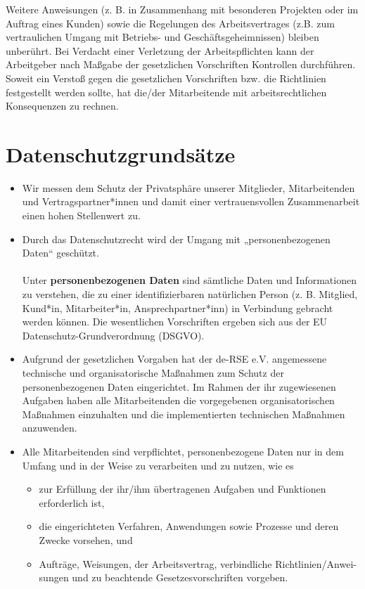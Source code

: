 \documentclass[a4paper, fontsize=11pt]{scrartcl}
\begin{document}
Weitere Anweisungen (z. B. in Zusammenhang mit besonderen Projekten oder im Auftrag eines Kunden) sowie die Regelungen des Arbeitsvertrages (z.B. zum vertraulichen Umgang mit Betriebs- und Geschäftsgeheimnissen) bleiben unberührt. Bei Verdacht einer Verletzung der Arbeitspflichten kann der Arbeitgeber nach Maßgabe der gesetzlichen Vorschriften Kontrollen durchführen. Soweit ein Verstoß gegen die gesetzlichen Vorschriften bzw. die Richtlinien festgestellt werden sollte, hat die/der Mitarbeitende mit arbeitsrechtlichen Konsequenzen zu rechnen.

\section{Datenschutzgrundsätze}
\begin{itemize}
  \item Wir messen dem Schutz der Privatsphäre unserer Mitglieder, Mitarbeitenden und Vertragspartner*innen und damit einer vertrauensvollen Zusammenarbeit einen hohen Stellenwert zu.
  \item Durch das Datenschutzrecht wird der Umgang mit „personenbezogenen Daten“ geschützt.\\
  \\
  Unter \textbf{personenbezogenen Daten} sind sämtliche Daten und Informationen zu verstehen, die zu einer identifizierbaren natürlichen Person (z. B. Mitglied, Kund*in, Mitarbeiter*in, Ansprechpartner*inn) in Verbindung gebracht werden können. Die wesentlichen Vorschriften ergeben sich aus der EU Datenschutz-Grundverordnung (DSGVO).
  \item Aufgrund der gesetzlichen Vorgaben hat der de-RSE e.V. angemessene technische und organisatorische Maßnahmen zum Schutz der personenbezogenen Daten eingerichtet. Im Rahmen der ihr zugewiesenen Aufgaben haben alle Mitarbeitenden die vorgegebenen organisatorischen Maßnahmen einzuhalten und die implementierten technischen Maßnahmen anzuwenden.
  \item Alle Mitarbeitenden sind verpflichtet, personenbezogene Daten nur in dem Umfang und in der Weise zu verarbeiten und zu nutzen, wie es
  \begin{itemize}
    \item zur Erfüllung der ihr/ihm übertragenen Aufgaben und Funktionen erforderlich ist,
    \item die eingerichteten Verfahren, Anwendungen sowie Prozesse und deren Zwecke vorsehen, und
    \item Aufträge, Weisungen, der Arbeitsvertrag, verbindliche Richtlinien/Anwei-sungen und zu beachtende Gesetzesvorschriften vorgeben.

\end{itemize}
\end{itemize}
\end{document}

